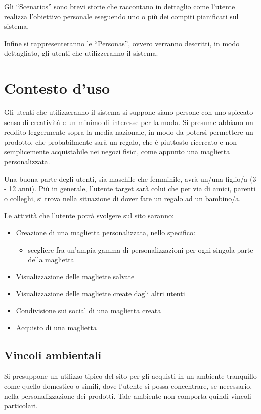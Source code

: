 \documentclass[12pt,italian,]{report}
\begin{document}
Gli ``Scenarios'' sono brevi storie che raccontano in dettaglio come
l'utente realizza l'obiettivo personale eseguendo uno o più dei compiti
pianificati sul sistema.

Infine si rappresenteranno le ``Personas'', ovvero verranno descritti,
in modo dettagliato, gli utenti che utilizzeranno il sistema.

\hypertarget{contesto-duso}{%
\section{Contesto d'uso}\label{contesto-duso}}

Gli utenti che utilizzeranno il sistema si suppone siano persone con uno spiccato senso di creatività e un minimo di interesse per la moda. Si presume abbiano un reddito leggermente sopra la media nazionale, in modo da potersi permettere un prodotto, che probabilmente sarà un regalo, che è piuttosto ricercato e non semplicemente acquistabile nei negozi fisici, come appunto una maglietta personalizzata.

Una buona parte degli utenti, sia maschile che femminile, avrà un/una figlio/a (3 - 12 anni). 
Più in generale, l'utente target sarà colui che per via di amici, parenti o colleghi, si trova nella situazione di dover fare un regalo ad un bambino/a.

Le attività che l'utente potrà svolgere sul sito saranno:
\begin{itemize}
\item Creazione di una maglietta personalizzata, nello specifico: 
\begin{itemize}
\item scegliere fra un'ampia gamma di personalizzazioni per ogni singola parte della maglietta
\end{itemize}
\item Visualizzazione delle magliette salvate
\item Visualizzazione delle magliette create dagli altri utenti
\item Condivisione sui social di una maglietta creata
\item Acquisto di una maglietta
\end{itemize}

\subsection{Vincoli ambientali}\label{vincoli-ambientali}

Si presuppone un utilizzo tipico del sito per gli acquisti in un ambiente tranquillo come quello domestico o simili, dove l'utente si possa concentrare, se necessario, nella personalizzazione dei prodotti.
Tale ambiente non comporta quindi vincoli particolari.
\end{document}

